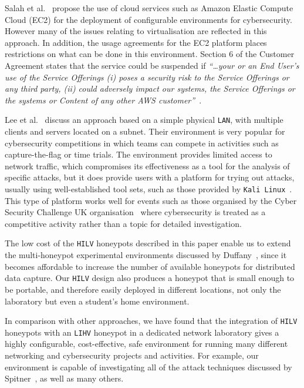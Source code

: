 \documentclass{ieeeaccess}
\begin{document}
Salah et al.~\cite{SHZ:15} propose the use of cloud services such as Amazon
Elastic Compute Cloud (EC2) for the deployment of configurable environments for
cybersecurity. However many of the issues relating to virtualisation are
reflected in this approach. In addition, the usage agreements for the EC2
platform places restrictions on what can be done in this environment. Section 6
of the Customer Agreement states that the service could be suspended if
\textit{``\ldots your or an End User's use of the Service Offerings (i) poses a
security risk to the Service Offerings or any third party, (ii) could adversely
impact our systems, the Service Offerings or the systems or Content of any
other AWS customer''}~\cite{AWS:18}.

Lee et al.~\cite{LUFC:11} discuss an approach based on a simple physical
\texttt{LAN}, with multiple clients and servers located on a subnet.  Their
environment is very popular for cybersecurity competitions in which teams can
compete in activities such as capture-the-flag or time trials. The environment
provides limited access to network traffic, which compromises its effectiveness
as a tool for the analysis of specific attacks, but it does provide users with a
platform for trying out attacks, usually using well-established tool sets, such
as those provided by \texttt{Kali Linux}~\cite{OS:17}. This type of platform
works well for events such as those organised by the Cyber Security Challenge
UK organisation~\cite{CSCUK:18} where cybersecurity is treated as a competitive
activity rather than a topic for detailed investigation.  

The low cost of the \texttt{HILV} honeypots described in this paper enable us
to extend the multi-honeypot experimental environments discussed by
Duffany~\cite{JD:08}, since it becomes affordable to increase the number of
available honeypots for distributed data capture. Our \texttt{HILV} design also
produces a honeypot that is small enough to be portable, and therefore easily
deployed in different locations, not only the laboratory but even a student's
home environment.

In comparison with other approaches, we have found that the integration of
\texttt{HILV} honeypots with an \texttt{LIHV} honeypot in a dedicated network
laboratory gives a highly configurable, cost-effective, safe environment for
running many different networking and cybersecurity projects and activities.
For example, our environment is capable of investigating all of the
attack techniques discussed by Spitner~\cite{LS:03}, as well as many others.
\end{document}
